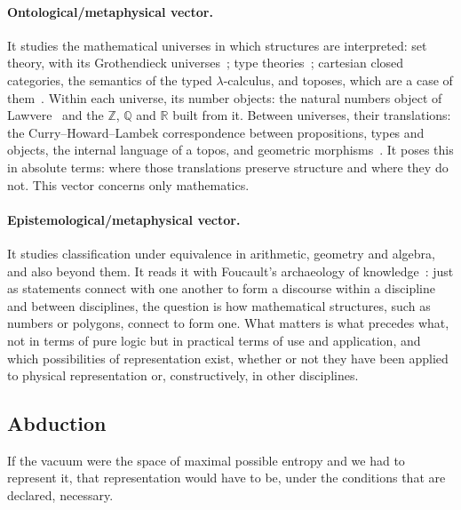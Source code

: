 \documentclass[11pt,reqno]{amsart}
\numberwithin{equation}{section}
\theoremstyle{remark}
\begin{document}
\paragraph{Ontological/metaphysical vector.} It studies the mathematical universes in which structures
are interpreted: set theory, with its Grothendieck universes~\cite{SGA4}; type theories~\cite{Rus08};
cartesian closed categories, the semantics of the typed $\lambda$-calculus, and toposes, which are a
case of them~\cite{LS86}. Within each universe, its number objects: the natural numbers object of
Lawvere~\cite{Law64} and the $\mathbb Z$, $\mathbb Q$ and $\mathbb R$ built from it. Between
universes, their translations: the Curry--Howard--Lambek correspondence between propositions, types
and objects, the internal language of a topos, and geometric morphisms~\cite{How80,LS86}. It poses this in
absolute terms: where those translations preserve structure and where they do not. This vector
concerns only mathematics.

\paragraph{Epistemological/metaphysical vector.} It studies classification under equivalence in
arithmetic, geometry and algebra, and also beyond them. It reads it with Foucault's archaeology of
knowledge~\cite{Fou69}: just as statements connect with one another to form a discourse within a
discipline and between disciplines, the question is how mathematical structures, such as numbers or
polygons, connect to form one. What matters is what precedes what, not in terms of pure logic but in
practical terms of use and application, and which possibilities of representation exist, whether or
not they have been applied to physical representation or, constructively, in other disciplines.

\subsection{Abduction}
If the vacuum were the space of maximal possible entropy and we had to represent it, that
representation would have to be, under the conditions that are declared, necessary.
\end{document}
